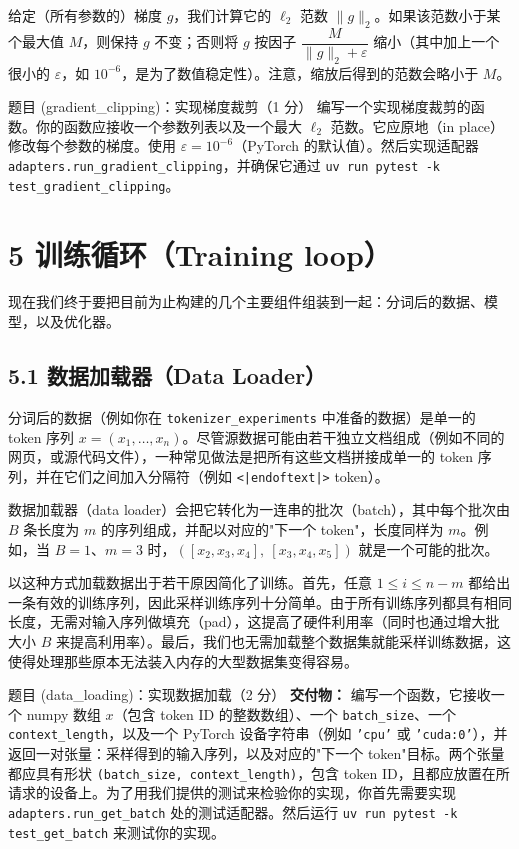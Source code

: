 给定（所有参数的）梯度 $g$，我们计算它的 $\ell_2$ 范数 $\|g\|_2$。如果该范数小于某个最大值 $M$，则保持 $g$ 不变；否则将 $g$ 按因子 $\dfrac{M}{\|g\|_2 + \varepsilon}$ 缩小（其中加上一个很小的 $\varepsilon$，如 $10^{-6}$，是为了数值稳定性）。注意，缩放后得到的范数会略小于 $M$。

\begin{problembox}{题目 (gradient\_clipping)：实现梯度裁剪（1 分）}
编写一个实现梯度裁剪的函数。你的函数应接收一个参数列表以及一个最大 $\ell_2$ 范数。它应原地（in place）修改每个参数的梯度。使用 $\varepsilon = 10^{-6}$（PyTorch 的默认值）。然后实现适配器 \texttt{adapters.run\_gradient\_clipping}，并确保它通过 \texttt{uv run pytest -k test\_gradient\_clipping}。
\end{problembox}

\section*{5 训练循环（Training loop）}

现在我们终于要把目前为止构建的几个主要组件组装到一起：分词后的数据、模型，以及优化器。

\subsection*{5.1 数据加载器（Data Loader）}

分词后的数据（例如你在 \texttt{tokenizer\_experiments} 中准备的数据）是单一的 token 序列 $x = (x_1, \dots, x_n)$。尽管源数据可能由若干独立文档组成（例如不同的网页，或源代码文件），一种常见做法是把所有这些文档拼接成单一的 token 序列，并在它们之间加入分隔符（例如 \texttt{<|endoftext|>} token）。

数据加载器（data loader）会把它转化为一连串的批次（batch），其中每个批次由 $B$ 条长度为 $m$ 的序列组成，并配以对应的"下一个 token"，长度同样为 $m$。例如，当 $B = 1$、$m = 3$ 时，$([x_2, x_3, x_4],\ [x_3, x_4, x_5])$ 就是一个可能的批次。

以这种方式加载数据出于若干原因简化了训练。首先，任意 $1 \le i \le n - m$ 都给出一条有效的训练序列，因此采样训练序列十分简单。由于所有训练序列都具有相同长度，无需对输入序列做填充（pad），这提高了硬件利用率（同时也通过增大批大小 $B$ 来提高利用率）。最后，我们也无需加载整个数据集就能采样训练数据，这使得处理那些原本无法装入内存的大型数据集变得容易。

\begin{problembox}{题目 (data\_loading)：实现数据加载（2 分）}
\textbf{交付物：} 编写一个函数，它接收一个 numpy 数组 $x$（包含 token ID 的整数数组）、一个 \texttt{batch\_size}、一个 \texttt{context\_length}，以及一个 PyTorch 设备字符串（例如 \texttt{'cpu'} 或 \texttt{'cuda:0'}），并返回一对张量：采样得到的输入序列，以及对应的"下一个 token"目标。两个张量都应具有形状 \texttt{(batch\_size, context\_length)}，包含 token ID，且都应放置在所请求的设备上。为了用我们提供的测试来检验你的实现，你首先需要实现 \texttt{adapters.run\_get\_batch} 处的测试适配器。然后运行 \texttt{uv run pytest -k test\_get\_batch} 来测试你的实现。
\end{problembox}


